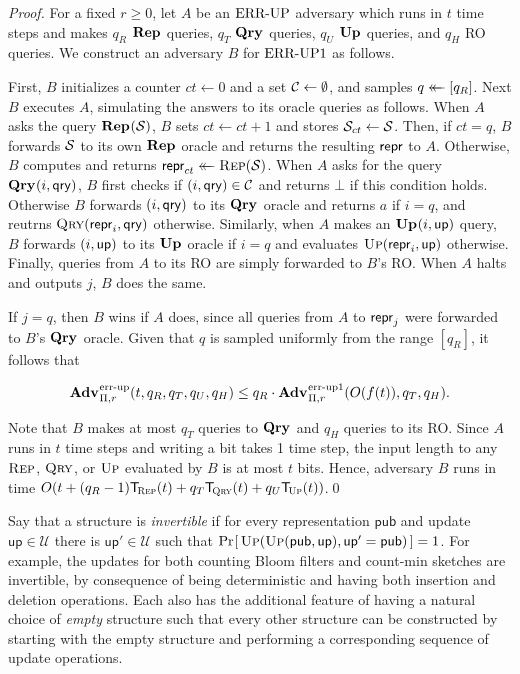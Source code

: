 \begin{proof}For a fixed $r \ge 0$, let $A$ be an $\textnormal{ERR\mbox{-}UP}$ adversary which runs in $t$ time steps and makes $q_R$ $\mathbf{Rep}\hspace{0.5pt}$ queries, $q_T$ $\mathbf{Qry}\hspace{0.5pt}$ queries, $q_U$ $\mathbf{Up}\hspace{0.5pt}$ queries, and $q_H$ RO queries. We construct an adversary $B$ for $\textnormal{ERR\mbox{-}UP}1$ as follows.

First, $B$ initializes a counter $ct \gets 0$ and a set $\mathcal{C} \gets \emptyset$, and samples $q \mathrel{\leftarrow\mkern-14mu\leftarrow} [q_R]$. Next $B$ executes $A$, simulating the answers to its oracle queries as follows. When $A$ asks the query $\mathbf{Rep}\hspace{0.5pt}(\mathcal{S})$, $B$ sets $ct \gets ct + 1$ and stores $\mathcal{S}_{ct} \gets \mathcal{S}$. Then, if $ct = q$, $B$ forwards $\mathcal{S}$ to its own $\mathbf{Rep}\hspace{0.5pt}$ oracle and returns the resulting $\mathsf{repr}$ to $A$. Otherwise, $B$ computes and returns $\mathsf{repr}_{ct} \mathrel{\leftarrow\mkern-14mu\leftarrow} \textsc{Rep}(\mathcal{S})$. When $A$ asks for the query $\mathbf{Qry}\hspace{0.5pt}(i,\mathsf{qry})$, $B$ first checks if $(i,\mathsf{qry}) \in \mathcal{C}$ and returns $\bot$ if this condition holds. Otherwise $B$ forwards $(i,\mathsf{qry})$ to its $\mathbf{Qry}\hspace{0.5pt}$ oracle and returns $a$ if $i = q$, and reutrns $\textsc{Qry}(\mathsf{repr}_i,\mathsf{qry})$ otherwise. Similarly, when $A$ makes an $\mathbf{Up}\hspace{0.5pt}(i,\mathsf{up})$ query, $B$ forwards $(i,\mathsf{up})$ to its $\mathbf{Up}\hspace{0.5pt}$ oracle if $i = q$ and evaluates $\textsc{Up}(\mathsf{repr}_i,\mathsf{up})$ otherwise. Finally, queries from $A$ to its RO are simply forwarded to $B$'s RO. When $A$ halts and outputs $j$, $B$ does the same.

If $j = q$, then $B$ wins if $A$ does, since all queries from $A$ to $\mathsf{repr}_j$ were forwarded to $B$'s $\mathbf{Qry}\hspace{0.5pt}$ oracle. Given that $q$ is sampled uniformly from the range $[q_R]$, it follows that

$$\Adv{\errep}_{\struct,r}(t, q_R, q_T, q_U, q_H) \leq q_R\cdot\Adv{\errep1}_{\struct,r}(O(f(t)), q_T, q_H).$$

Note that $B$ makes at most $q_T$ queries to $\mathbf{Qry}\hspace{0.5pt}$ and $q_H$ queries to its RO. Since $A$ runs in $t$ time steps and writing a bit takes 1 time step, the input length to any $\textsc{Rep}$, $\textsc{Qry}$, or $\textsc{Up}$ evaluated by $B$ is at most $t$ bits. Hence, adversary $B$ runs in time $O(t+(q_R-1)\ticks(\Rep,t)+q_T\ticks(\Qry,t)+q_U\ticks(\Up,t))$.\hfill\qed
\end{proof}

Say that a structure is {\em invertible} if for every representation $\mathsf{pub}$ and update $\mathsf{up} \in \mathcal{U}$ there is $\mathsf{up}' \in \mathcal{U}$ such that $\Pr\hspace{-1pt}\left[\,\textsc{Up}(\textsc{Up}(\mathsf{pub},\mathsf{up}),\mathsf{up}' = \mathsf{pub})\,\right] = 1$.  For example, the updates for both counting Bloom filters and count-min sketches are invertible, by consequence of being deterministic and having both insertion and deletion operations. Each also has the additional feature of having a natural choice of {\em empty} structure such that every other structure can be constructed by starting with the empty structure and performing a corresponding sequence of update operations.

